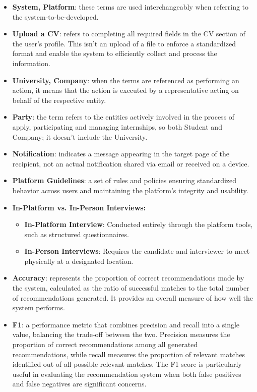 \begin{itemize}

\item \textbf{System, Platform}: these terms are used interchangeably when referring to the system-to-be-developed.

\item \textbf{Upload a CV}: refers to completing all required fields in the CV section of the user's profile. This isn't an upload of a file to enforce a standardized format and enable the system to efficiently collect and process the information.

\item \textbf{University, Company}: when the terms are referenced as performing an action, it means that the action is executed by a representative acting on behalf of the respective entity.

\item \textbf{Party}: the term refers to the entities actively involved in the process of apply, participating and managing internships, so both Student and Company; it doesn't include the University.

\item \textbf{Notification}: indicates a message appearing in the target page of the recipient, not an actual notification shared via email or received on a device.

\item \textbf{Platform Guidelines}: a set of rules and policies ensuring standardized behavior across users and maintaining the platform's integrity and usability.

\item \textbf{In-Platform vs. In-Person Interviews:}

\begin{itemize}
\item \textbf{In-Platform Interview}: Conducted entirely through the platform tools, such as structured questionnaires.
\item \textbf{In-Person Interviews}: Requires the candidate and interviewer to meet physically at a designated location.
\end{itemize}

\item \textbf{Accuracy}: represents the proportion of correct recommendations made by the system, calculated as the ratio of successful matches to the total number of recommendations generated. It provides an overall measure of how well the system performs.

\item \textbf{F1}: a performance metric that combines precision and recall into a single value, balancing the trade-off between the two. Precision measures the proportion of correct recommendations among all generated recommendations, while recall measures the proportion of relevant matches identified out of all possible relevant matches. The F1 score is particularly useful in evaluating the recommendation system when both false positives and false negatives are significant concerns.

\end{itemize}

